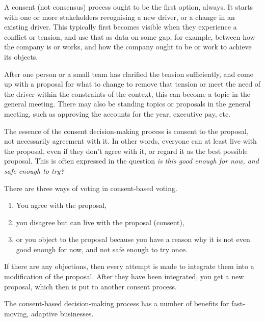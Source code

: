 A consent (not consensus) process ought to be the first option, always. It starts with one or more stakeholders recognising a new driver, or a change in an existing driver. This typically first becomes visible when they experience a conflict or tension, and use that as data on some gap, for example, between how the company is or works, and how the company ought to be or work to achieve its objects. 


After one person or a small team has clarified the tension sufficiently, and come up with a proposal for what to change to remove that tension or meet the need of the driver within the constraints of the context, this can become a topic in the general meeting. There may also be standing topics or proposals in the general meeting, such as approving the accounts for the year, executive pay, etc.


The essence of the consent decision-making process is consent to the proposal, not necessarily agreement with it. In other words, everyone can at least live with the proposal, even if they don't agree with it, or regard it as the best possible proposal. This is often expressed in the question \emph{is this good enough for now, and safe enough to try?}


There are three ways of voting in consent-based voting. 


\begin{enumerate}
\item You agree with the proposal, 
\item you disagree but can live with the proposal (consent), 
\item or you object to the proposal because you have a reason why it is not even good enough for now, and not safe enough to try once.
\end{enumerate}


If there are any objections, then every attempt is made to integrate them into a modification of the proposal. After they have been integrated, you get a new proposal, which then is put to another consent process.


The consent-based decision-making process has a number of benefits for fast-moving, adaptive businesses.


